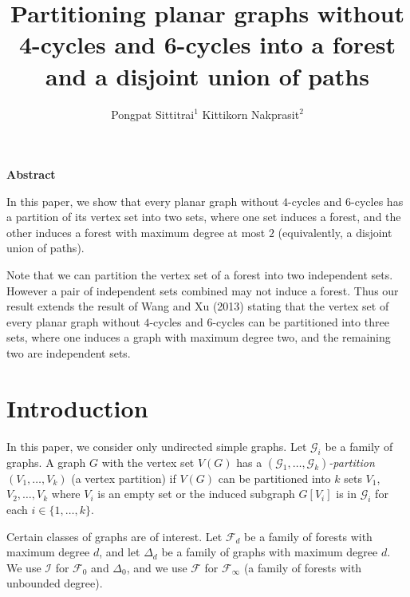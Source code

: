 \documentclass[11pt]{amsart} %
\title{Partitioning planar graphs without 4-cycles and 6-cycles 
into a forest and a disjoint union of paths}
\author{Pongpat Sittitrai$^{1}$ \hskip 0.2in Kittikorn Nakprasit$^{2}$}
\theoremstyle{definition}
\begin{document}
\maketitle

\begin{center}{\bf Abstract}\end{center}
\indent\indent

In this paper, we show that every planar graph without $4$-cycles 
and $6$-cycles has a partition of its vertex set into two sets, 
where one set induces a forest, and the other induces a forest 
with maximum degree at most $2$ 
(equivalently, a disjoint union of paths). 

Note that we can partition the vertex set of a forest into two independent sets. 
However a pair of independent sets combined may not induce a forest. 
Thus our result extends the result of Wang and Xu (2013) 
stating that the vertex set of every planar graph without $4$-cycles 
and $6$-cycles can be partitioned into three sets, 
where one induces a graph with maximum degree two, 
and the remaining two are independent sets. 


\section{Introduction} 
In this paper, we consider only undirected simple graphs. 
Let $\mathcal{G}_i$ be a family of graphs. 
A graph $G$ with the vertex set $V(G)$ has a 
\emph{$(\mathcal{G}_1, \dots,  \mathcal{G}_k)$-partition} 
$(V_1, \dots, V_k)$ (a vertex partition) 
if $V(G)$ can be partitioned into 
$k$ sets $V_1$, $V_2,\dots, V_k$ where $V_i$ is an empty set or 
the induced subgraph $G[V_i]$ is in $\mathcal{G}_i$ for each $i\in\{1,\dots,k\}$. 


Certain classes of graphs are of interest. 
Let  $\mathcal{F}_d$ be a family of forests with maximum degree $d$, 
and let  $\Delta_d$ be a family of graphs with maximum degree $d$. 
We use $\mathcal{I}$ for $\mathcal{F}_0$ and $\Delta_0$, 
and we use $\mathcal{F}$ for $\mathcal{F}_\infty$ 
(a family of forests with unbounded degree). 
\end{document}
